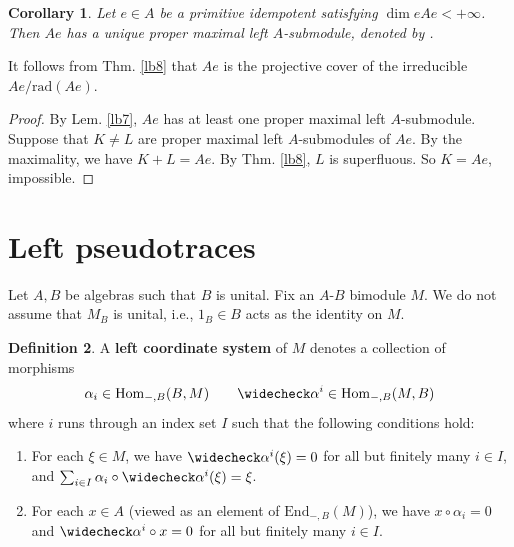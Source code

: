 \documentclass[11pt,b5paper,notitlepage]{article}
\theoremstyle{definition}
\newtheorem{df}{Definition}[section]
\theoremstyle{plain}
\newtheorem{co}[df]{Corollary}
\newcommand{\wch}{\widecheck}
\newcommand{\End}{\mathrm{End}} %
\newcommand{\Hom}{\mathrm{Hom}}
\newcommand{\rad}{\mathrm{rad}}
\numberwithin{equation}{section}
\begin{document}
\begin{co}\label{lb11}
Let $e\in A$ be a primitive idempotent satisfying $\dim eAe<+\infty$. Then $Ae$ has a unique proper maximal left $A$-submodule, denoted by \pmb{$\rad(Ae)$}.
\end{co}

It follows from Thm. \ref{lb8} that $Ae$ is the projective cover of the irreducible $Ae/\rad(Ae)$.

\begin{proof}
By Lem. \ref{lb7}, $Ae$ has at least one proper maximal left $A$-submodule. Suppose that $K\neq L$ are proper maximal left $A$-submodules of $Ae$. By the maximality, we have $K+L=Ae$. By Thm. \ref{lb8}, $L$ is superfluous. So $K=Ae$, impossible. 
\end{proof}





\section{Left pseudotraces}


Let $A,B$ be algebras such that $B$ is unital. Fix an $A$-$B$ bimodule $M$. We do not assume that $M_B$ is unital, i.e., $1_B\in B$ acts as the identity on $M$. 


\begin{df}\label{lb41}
A \textbf{left coordinate system} of $M$ denotes a collection of morphisms 
\begin{align}\label{eq10}
\alpha_i\in\Hom_{-,B}(B,M)\qquad \wch\alpha^i\in \Hom_{-,B}(M,B)
\end{align}
where $i$ runs through an index set $I$ such that the following conditions hold:
\begin{enumerate}[label=(\alph*)]
\item  For each $\xi\in M$, we have $\wch\alpha^i(\xi)=0$ for all but finitely many $i\in I$, and  $\sum_{i\in I}\alpha_i\circ\wch\alpha^i(\xi)=\xi$.
\item For each $x\in A$ (viewed as an element of $\End_{-,B}(M)$), we have $x\circ\alpha_i=0$ and $\wch\alpha^i\circ x=0$ for all but finitely many $i\in I$.
\end{enumerate}
\end{df}
\end{document}
